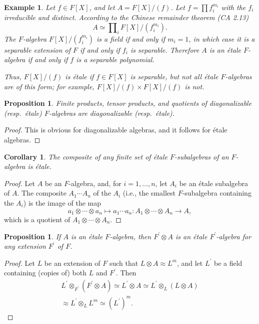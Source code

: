 \documentclass[a4paper,11pt,final,openany]{memoir}
\newtheorem{corollary}[X]{Corollary}
\newtheorem{proposition}[X]{Proposition}
\newtheorem{example}[X]{Example}
\theoremstyle{nonumberplain}
\newtheorem{proof}{Proof.}
\begin{document}
\begin{example}
\label{ag41}Let $f\in F[X]$, and let $A=F[X]/(f)$. Let $f=\prod f_{i}^{m_{i}}$
with the $f_{i}$ irreducible and distinct. According to the Chinese remainder
theorem (CA 2.13)%
\[
A\simeq\prod\nolimits_{i}F[X]/(f_{i}^{m_{i}}).
\]
The $F$-algebra $F[X]/(f_{i}^{m_{i}})$ is a field if and only if $m_{i}=1$, in
which case it is a separable extension of $F$ if and only if $f_{i}$ is
separable. Therefore $A$ is an \'{e}tale $F$-algebra if and only if $f$ is a
separable polynomial.

Thus, $F[X]/(f)$ is \'{e}tale if $f\in F[X]$ is separable, but not all
\'{e}tale $F$-algebras are of this form; for example, $F[X]/(f)\times
F[X]/(f)$ is not.
\end{example}

\begin{proposition}
\label{B68}Finite products, tensor products, and quotients of diagonalizable
(resp.\ \'{e}tale) $F$-algebras are diagonalizable (resp.\ \'{e}tale).
\end{proposition}

\begin{proof}
This is obvious for diagonalizable algebras, and it follows for \'{e}tale algebras.
\end{proof}

\begin{corollary}
\label{B69}The composite of any finite set of \'{e}tale $F$-subalgebras of an
$F$-algebra is \'{e}tale.
\end{corollary}

\begin{proof}
Let $A$ be an $F$-algebra, and, for $i=1,\ldots,n$, let $A_{i}$ be an
\'{e}tale subalgebra of $A$. The composite $A_{1}\cdots A_{n}$ of the $A_{i}$
(i.e., the smallest $F$-subalgebra containing the $A_{i}$) is the image of the
map
\[
a_{1}\otimes\cdots\otimes a_{n}\mapsto a_{1}\cdots a_{n}\colon A_{1}%
\otimes\cdots\otimes A_{n}\rightarrow A,
\]
which is a quotient of $A_{1}\otimes\cdots\otimes A_{n}$.
\end{proof}

\begin{proposition}
\label{B70}If $A$ is an \'{e}tale $F$-algebra, then $F^{\prime}\otimes A$ is
an \'{e}tale $F^{\prime}$-algebra for any extension $F^{\prime}$ of $F$.
\end{proposition}

\begin{proof}
Let $L$ be an extension of $F$ such that $L\otimes A\approx L^{m}$, and let
$L^{\prime}$ be a field containing (copies of) both $L$ and $F^{\prime}$.
Then
\begin{align*}
L^{\prime}\otimes_{F^{\prime}}\left(  F^{\prime}\otimes A\right)  \simeq
L^{\prime}\otimes A\simeq L^{\prime}\otimes_{L}(L\otimes A)\\
\approx L^{\prime
}\otimes_{L}L^{m}\simeq\left(  L^{\prime}\right)  ^{m}\text{.}%
\end{align*}

\end{proof}
\end{document}

